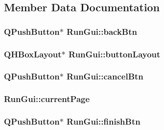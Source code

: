 \subsection{Member Data Documentation}
\hypertarget{class_run_gui_a5a79c5d8f3a61510c2be51738e428473}{
\subsubsection[{back\-Btn}]{\setlength{\rightskip}{0pt plus 5cm}Q\-Push\-Button$\ast$ Run\-Gui\-::back\-Btn\hspace{0.3cm}{\ttfamily [private]}}}\label{class_run_gui_a5a79c5d8f3a61510c2be51738e428473}
\hypertarget{class_run_gui_a812f0836d9eb5b0148cf92b61bc53be2}{
\subsubsection[{button\-Layout}]{\setlength{\rightskip}{0pt plus 5cm}Q\-H\-Box\-Layout$\ast$ Run\-Gui\-::button\-Layout\hspace{0.3cm}{\ttfamily [private]}}}\label{class_run_gui_a812f0836d9eb5b0148cf92b61bc53be2}
\hypertarget{class_run_gui_aa14d8877052e9cc11c93055561501792}{
\subsubsection[{cancel\-Btn}]{\setlength{\rightskip}{0pt plus 5cm}Q\-Push\-Button$\ast$ Run\-Gui\-::cancel\-Btn\hspace{0.3cm}{\ttfamily [private]}}}\label{class_run_gui_aa14d8877052e9cc11c93055561501792}
\hypertarget{class_run_gui_a1d93e84df8a71767ca927554e5b0fe0d}{
\subsubsection[{current\-Page}]{ Run\-Gui\-::current\-Page\hspace{0.3cm}{\ttfamily [private]}}}\label{class_run_gui_a1d93e84df8a71767ca927554e5b0fe0d}
\hypertarget{class_run_gui_a2989fde08a236488c152c8fa584c3380}{
\subsubsection[{finish\-Btn}]{\setlength{\rightskip}{0pt plus 5cm}Q\-Push\-Button$\ast$ Run\-Gui\-::finish\-Btn\hspace{0.3cm}{\ttfamily [private]}}}\label{class_run_gui_a2989fde08a236488c152c8fa584c3380}
